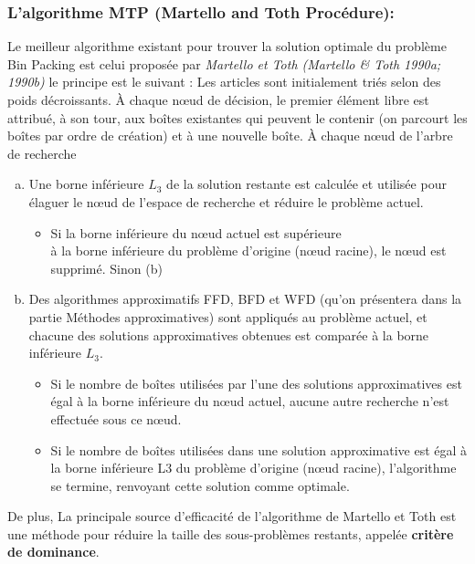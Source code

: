 \documentclass[class=report, crop=false]{standalone}
\begin{document}
    \subsubsection*{L’algorithme MTP (Martello and Toth Procédure):}
    Le meilleur algorithme existant pour trouver la solution optimale du problème Bin Packing est celui proposée par  \emph{Martello et Toth (Martello \& Toth 1990a; 1990b)} le principe est le suivant :  
Les articles sont initialement triés selon des poids décroissants. À chaque nœud de décision, le premier élément libre est attribué, à son tour, aux boîtes existantes qui peuvent le contenir (on parcourt les boîtes par ordre de création) et à une nouvelle boîte. 
À chaque nœud de l'arbre de recherche 
\begin{enumerate}[a.]
    \item Une borne inférieure \(L_3\) de la solution restante est calculée et utilisée pour élaguer le nœud de l'espace de recherche et réduire le problème actuel.
        \begin{itemize}
            \item Si la borne inférieure du nœud actuel est supérieure \\
            à la borne inférieure du problème d’origine (nœud racine), le nœud est supprimé. Sinon (b)
        \end{itemize}
    \item Des algorithmes approximatifs FFD, BFD et WFD (qu’on présentera dans la partie Méthodes approximatives) sont appliqués au problème actuel, et chacune des solutions approximatives obtenues est comparée à la borne inférieure \(L_3\).
        \begin{itemize}
            \item Si le nombre de boîtes utilisées par l'une des solutions approximatives est égal à la borne inférieure du nœud actuel, aucune autre recherche n'est effectuée sous ce nœud. 
            \item Si le nombre de boîtes utilisées dans une solution approximative est égal à la borne inférieure L3 du problème d'origine (nœud racine), l'algorithme se termine, renvoyant cette solution comme optimale.
        \end{itemize}
\end{enumerate}
De plus, La principale source d'efficacité de l'algorithme de Martello et Toth est une méthode pour réduire la taille des sous-problèmes restants, appelée \textbf{critère de dominance}.
\end{document}
